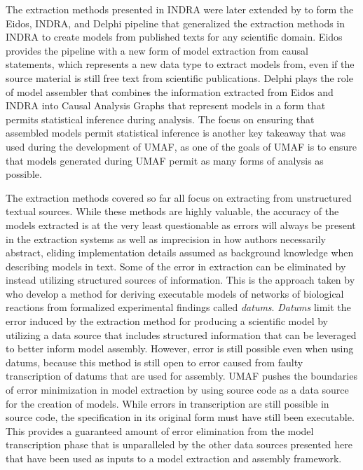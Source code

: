 The extraction methods presented in INDRA were later extended by \citet{EidosIndraDelphi} to form the Eidos, INDRA, and Delphi pipeline that generalized the extraction methods in INDRA to create models from published texts for any scientific domain.
Eidos provides the pipeline with a new form of model extraction from causal statements, which represents a new data type to extract models from, even if the source material is still free text from scientific publications.
Delphi plays the role of model assembler that combines the information extracted from Eidos and INDRA into Causal Analysis Graphs that represent models in a form that permits statistical inference during analysis.
The focus on ensuring that assembled models permit statistical inference is another key takeaway that was used during the development of UMAF, as one of the goals of UMAF is to ensure that models generated during UMAF permit as many forms of analysis as possible.

The extraction methods covered so far all focus on extracting from unstructured textual sources.
While these methods are highly valuable, the accuracy of the models extracted is at the very least questionable as errors will always be present in the extraction systems as well as imprecision in how authors necessarily abstract, eliding implementation details assumed as background knowledge when describing models in text.
Some of the error in extraction can be eliminated by instead utilizing structured sources of information.
This is the approach taken by \citet{nigam2015datums} who develop a method for deriving executable models of networks of biological reactions from formalized experimental findings called \textit{datums}.
\textit{Datums} limit the error induced by the extraction method for producing a scientific model by utilizing a data source that includes structured information that can be leveraged to better inform model assembly.
However, error is still possible even when using datums, because this method is still open to error caused from faulty transcription of datums that are used for assembly.
UMAF pushes the boundaries of error minimization in model extraction by using source code as a data source for the creation of models.
While errors in transcription are still possible in source code, the specification in its original form must have still been executable.
This provides a guaranteed amount of error elimination from the model transcription phase that is unparalleled by the other data sources presented here that have been used as inputs to a model extraction and assembly framework.
